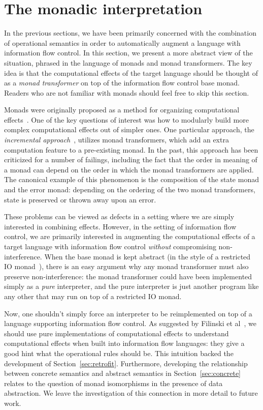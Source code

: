 \documentclass{sigplanconf}
\begin{document}
\section{The monadic interpretation}
\label{sec:monad}

In the previous sections, we have been primarily concerned with the
combination of operational semantics in order to automatically augment a
language with information flow control.  In this section, we present
a more abstract view of the situation, phrased in the language of monads
and monad transformers.  The key idea is that the computational effects
of the target language should be thought of as a \emph{monad transformer}
on top of the information flow control base monad.  Readers who are not
familiar with monads should feel free to skip this section.

Monads were originally proposed as a method for organizing computational
effects~\cite{Moggi:1991:NCM:116981.116984}.  One of the key questions
of interest was how to modularly build more complex computational
effects out of simpler ones.  One particular approach, the
\emph{incremental
approach}~\cite{Benton00monadsand,Liang95monadtransformers}, utilizes
monad transformers, which add an extra computation feature to a
pre-existing monad.  In the past, this approach has been criticized for
a number of failings, including the fact that the order in meaning of a
monad can depend on the order in which the monad transformers are
applied. The canonical example of this phenomenon is the
composition of the state monad and the error monad: depending on the
ordering of the two monad transformers, state is preserved or thrown away
upon an error.

These problems can be viewed as defects in a setting where we are
simply interested in combining effects.  However, in the setting of information
flow control, we are primarily interested in augmenting the
computational effects of a target language with information flow control
\emph{without} compromising non-interference.  When the base monad is
kept abstract (in the style of a restricted IO monad~\cite{Terei:2012:SH:2364506.2364524}),
there is an easy argument why any monad transformer must also preserve non-interference:
the monad transformer could have been implemented simply as a \emph{pure} interpreter, and
the pure interpreter is just another program like any other that may run on top of
a restricted IO monad.

Now, one shouldn't simply force an interpreter to be reimplemented on
top of a language supporting information flow control.  As suggested by
Filinski et al~\cite{Filinski:2010:MA:1707801.1706354}, we should use
pure implementations of computational effects to understand
computational effects when built into information flow languages: they
give a good hint what the operational rules should be.  This intuition
backed the development of Section~\ref{sec:retrofit}.  Furthermore,
developing the relationship between concrete semantics and abstract
semantics in Section~\ref{sec:concrete} relates to the question of monad
isomorphisms in the presence of data abstraction.  We leave the
investigation of this connection in more detail to future work.
\end{document}
